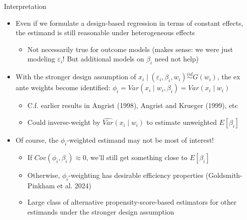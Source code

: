 \documentclass[11pt,english]{beamer}
\begin{document}
\begin{frame}{Interpretation}
\begin{itemize}
\item Even if we formulate a design-based regression in terms of constant effects, the estimand is still reasonable under heterogeneous effects\smallskip
\begin{itemize}
\item Not necessarily true for outcome models (makes sense: we were just modeling $\varepsilon_i$! But additional models on $\beta_i$ need not help)
\end{itemize}\medskip\pause{}
\item With the stronger design assumption of $x_i\mid (\varepsilon_i,\beta_i,w_i)\stackrel{iid}{\sim} G(w_i)$, the ex ante weights become identified: $\phi_i=Var(x_i\mid w_i,\beta_i)=Var(x_i\mid w_i)$\smallskip
\begin{itemize}
\item C.f. earlier results in Angrist (1998), Angrist and Krueger (1999), etc\smallskip\pause{}
\item Could inverse-weight by $\widehat{Var}(x_i\mid w_i)$ to estimate unweighted $E[\beta_i]$
\end{itemize}\medskip\pause{}
\item Of course, the $\phi_i$-weighted estimand may not be most of interest!\smallskip
\begin{itemize}
\item If $Cov(\phi_i,\beta_i)\approx 0$, we'll still get something close to $E[\beta_i]$\smallskip
\item Otherwise, $\phi_i$-weighting has desirable efficiency properties (Goldsmith-Pinkham et al. 2024)\smallskip
\item Large class of alternative propensity-score-based estimators for other estimands under the stronger design assumption
\end{itemize}
\end{itemize}
\end{frame}
\end{document}
